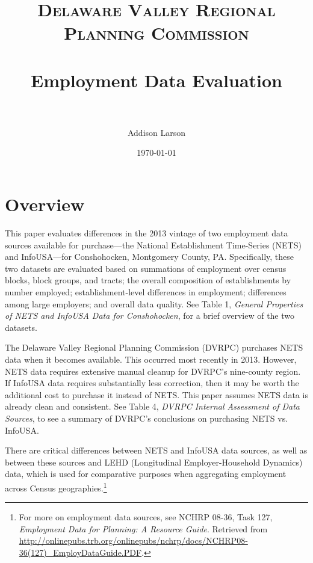 \documentclass[paper = letter, fontsize = 11pt]{scrartcl}
\title{	
\normalfont \normalsize 
\textsc{Delaware Valley Regional Planning Commission} \\ [25pt]
\horrule{0.5pt} \\[0.4cm]
\huge Employment Data Evaluation \\
\horrule{2pt} \\[0.5cm]
}
\author{\normalsize Addison Larson}
\date{\normalsize\today}
\begin{document}
\maketitle
\section{Overview}
This paper evaluates differences in the 2013 vintage of two employment data sources available for purchase---the National Establishment Time-Series (NETS) and InfoUSA---for Conshohocken, Montgomery County, PA. Specifically, these two datasets are evaluated based on summations of employment over census blocks, block groups, and tracts; the overall composition of establishments by number employed; establishment-level differences in employment; differences among large employers; and overall data quality. See Table 1, \textit{General Properties of NETS and InfoUSA Data for Conshohocken}, for a brief overview of the two datasets.\par
The Delaware Valley Regional Planning Commission (DVRPC) purchases NETS data when it becomes available. This occurred most recently in 2013. However, NETS data requires extensive manual cleanup for DVRPC's nine-county region. If InfoUSA data requires substantially less correction, then it may be worth the additional cost to purchase it instead of NETS. This paper assumes NETS data is already clean and consistent. See Table 4, \textit{DVRPC Internal Assessment of Data Sources}, to see a summary of DVRPC's conclusions on purchasing NETS vs. InfoUSA.\par
There are critical differences between NETS and InfoUSA data sources, as well as between these sources and LEHD (Longitudinal Employer-Household Dynamics) data, which is used for comparative purposes when aggregating employment across Census geographies.\footnote{For more on employment data sources, see NCHRP 08-36, Task 127, \textit{Employment Data for Planning: A Resource Guide}. Retrieved from \href{http://onlinepubs.trb.org/onlinepubs/nchrp/docs/NCHRP08-36(127)_EmployDataGuide.PDF}{http://onlinepubs.trb.org/onlinepubs/nchrp/docs/NCHRP08-36(127)\_EmployDataGuide.PDF}.}
\end{document}

